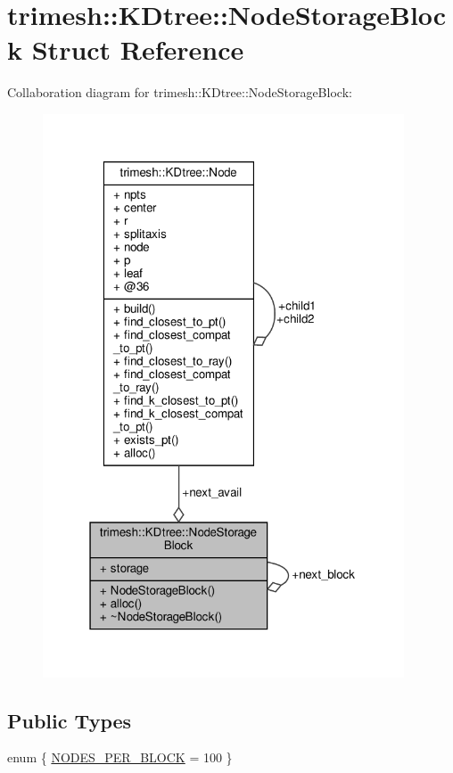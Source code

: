 \hypertarget{structtrimesh_1_1KDtree_1_1NodeStorageBlock}{}\section{trimesh\+:\+:K\+Dtree\+:\+:Node\+Storage\+Block Struct Reference}
\label{structtrimesh_1_1KDtree_1_1NodeStorageBlock}


Collaboration diagram for trimesh\+:\+:K\+Dtree\+:\+:Node\+Storage\+Block\+:\nopagebreak
\begin{figure}[H]
\begin{center}
\leavevmode
\includegraphics[width=304pt]{d4/df2/structtrimesh_1_1KDtree_1_1NodeStorageBlock__coll__graph}
\end{center}
\end{figure}
\subsection*{Public Types}
\begin{DoxyCompactItemize}
\item 
enum \{ \hyperlink{structtrimesh_1_1KDtree_1_1NodeStorageBlock_a0fc26f8428cdf04b3e99d1b57770292fabed02221dc8cfae72d1a32f807c5316f}{N\+O\+D\+E\+S\+\_\+\+P\+E\+R\+\_\+\+B\+L\+O\+CK} = 100
 \}
\end{DoxyCompactItemize}
